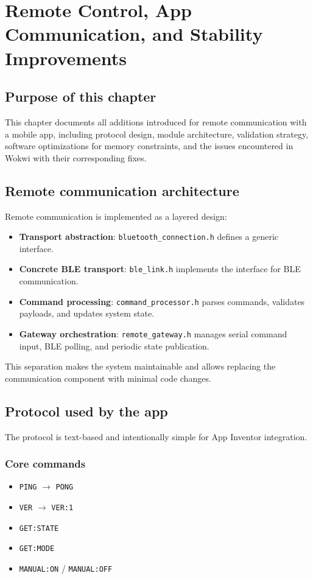 \chapter{Remote Control, App Communication, and Stability Improvements}

\section{Purpose of this chapter}
This chapter documents all additions introduced for remote communication with a mobile app, including protocol design, module architecture, validation strategy, software optimizations for memory constraints, and the issues encountered in Wokwi with their corresponding fixes.

\section{Remote communication architecture}
Remote communication is implemented as a layered design:

\begin{itemize}
  \item \textbf{Transport abstraction}: \texttt{bluetooth\_connection.h} defines a generic interface.
  \item \textbf{Concrete BLE transport}: \texttt{ble\_link.h} implements the interface for BLE communication.
  \item \textbf{Command processing}: \texttt{command\_processor.h} parses commands, validates payloads, and updates system state.
  \item \textbf{Gateway orchestration}: \texttt{remote\_gateway.h} manages serial command input, BLE polling, and periodic state publication.
\end{itemize}

This separation makes the system maintainable and allows replacing the communication component with minimal code changes.

\section{Protocol used by the app}
The protocol is text-based and intentionally simple for App Inventor integration.

\subsection{Core commands}
\begin{itemize}
  \item \texttt{PING} $\rightarrow$ \texttt{PONG}
  \item \texttt{VER} $\rightarrow$ \texttt{VER:1}
  \item \texttt{GET:STATE}
  \item \texttt{GET:MODE}
  \item \texttt{MANUAL:ON} / \texttt{MANUAL:OFF}
\end{itemize}


